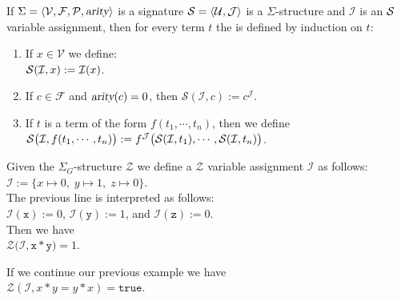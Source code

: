 \begin{Definition}
  If $\Sigma = \langle \mathcal{V}, \mathcal{F}, \mathcal{P}, \textsl{arity} \rangle$ is a signature
  $\struct = \pair(\mathcal{U},\mathcal{J})$ is a  $\Sigma$-structure and $\mathcal{I}$ is an  $\mathcal{S}$
    variable assignment, then for every term $t$ the  
     is defined by induction on $t$:
    \begin{enumerate}
    \item If $x \in \mathcal{V}$ we define: \\[0.2cm]
          \hspace*{1.3cm} $\mathcal{S}(\mathcal{I}, x) := \mathcal{I}(x)$.
    \item If $c \in \mathcal{F}$ and $\textsl{arity}(c) = 0$, then $\mathcal{S}(\mathcal{I}, c) := c^\mathcal{J}$.
    \item If $t$ is a term of the form $f(t_1,\cdots,t_n)$, then we define \\[0.2cm]
          \hspace*{1.3cm} $\mathcal{S}\bigl(\mathcal{I}, f(t_1,\cdots,t_n)\bigr) := 
                           f^\mathcal{J}\bigl( \mathcal{S}(\mathcal{I}, t_1), \cdots, \mathcal{S}(\mathcal{I}, t_n) \bigr)$.
                           \eox
    \end{enumerate}
\end{Definition}

\exampleEng
Given the $\Sigma_G$-structure
$\mathcal{Z}$ we define a $\mathcal{Z}$ variable assignment $\mathcal{I}$ as follows:
\\[0.2cm]
\hspace*{1.3cm} $\mathcal{I} := \bigl\{ x \mapsto 0,\; y \mapsto 1,\; z \mapsto 0\bigr\}$.
\\[0.2cm]
The previous line is interpreted as follows:
\\[0.2cm]
\hspace*{1.3cm} $\mathcal{I}(\mathtt{x}) := 0$, \quad $\mathcal{I}(\mathtt{y}) := 1$, \quad and \quad $\mathcal{I}(\mathtt{z}) := 0$.
\\[0.2cm]
Then we have  \\[0.2cm]
\hspace*{1.3cm}  $\mathcal{Z}\bigl(\mathcal{I}, \mathtt{x} * \mathtt{y} \bigr) = 1$. \eox



\exampleEng
If we continue our previous example we have
\\[0.2cm]
\hspace*{1.3cm} 
$\mathcal{Z}(\mathcal{I},x * y = y * x) = \mathtt{true}$.
\eox

